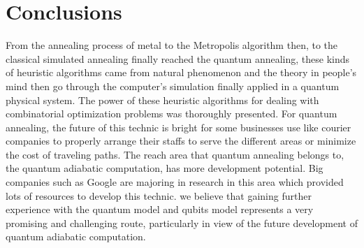 \documentclass{turabian-researchpaper}
\begin{document}
\section{Conclusions}
    From the annealing process of metal to the Metropolis algorithm then, to the classical simulated annealing finally reached the quantum annealing, these kinds of heuristic algorithms came from natural phenomenon and the theory in people's mind then go through the computer's simulation finally applied in a quantum physical system. The power of these heuristic algorithms for dealing with combinatorial optimization problems was thoroughly presented. For quantum annealing, the future of this technic is bright for some businesses use like courier companies to properly arrange their staffs to serve the different areas or minimize the cost of traveling paths. The reach area that quantum annealing belongs to, the quantum adiabatic computation, has more development potential. Big companies such as Google are majoring in research in this area which provided lots of resources to develop this technic. we believe that gaining further experience with the quantum model and qubits model represents a very promising and challenging route, particularly in view of the future development of quantum adiabatic computation.


\end{document}

